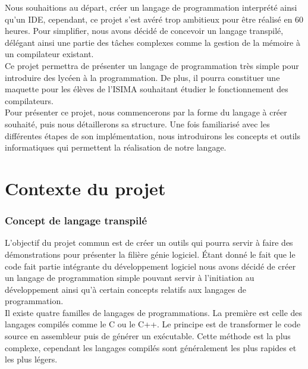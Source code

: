 \documentclass[a4paper]{article}%
\begin{document}
Nous souhaitions au départ, créer un langage de programmation interprété ainsi
qu'un IDE, cependant, ce projet s'est avéré trop ambitieux pour être réalisé en
60 heures. Pour simplifier, nous avons décidé de concevoir un langage transpilé,
délégant ainsi une partie des tâches complexes comme la gestion de la mémoire à
un compilateur existant.\\

Ce projet permettra de présenter un langage de programmation très simple pour
introduire des lycéen à la programmation. De plus, il pourra constituer une
maquette pour les élèves de l'ISIMA souhaitant étudier le fonctionnement des
compilateurs.\\

Pour présenter ce projet, nous commencerons par la forme du langage à créer
souhaité, puis nous détaillerons sa structure. Une fois familiarisé avec les
différentes étapes de son implémentation,  nous introduirons les concepts et
outils informatiques qui permettent la réalisation de notre langage.\\

\normalsize
\clearpage{}



\part{Contexte du projet}

\section{Concept de langage transpilé}

L'objectif du projet commun est de créer un outils qui pourra servir à faire des
démonstrations pour présenter la filière génie logiciel. Étant donné le fait que
le code fait partie intégrante du développement logiciel nous avons décidé de
créer un langage de programmation simple pouvant servir à l'initiation au
développement ainsi qu'à certain concepts relatifs aux langages de
programmation.\\

Il existe quatre familles de langages de programmations. La première est celle
des langages compilés comme le C ou le C++. Le principe est de transformer le
code source en assembleur puis de générer un exécutable. Cette méthode est la
plus complexe, cependant les langages compilés sont généralement les plus
rapides et les plus légers.
\end{document}
